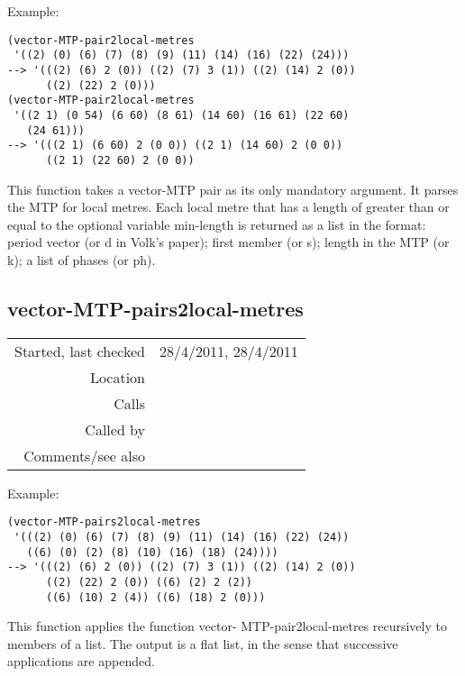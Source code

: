 \vspace{0.5cm}
\noindent Example:
\begin{verbatim}
(vector-MTP-pair2local-metres
 '((2) (0) (6) (7) (8) (9) (11) (14) (16) (22) (24)))
--> '(((2) (6) 2 (0)) ((2) (7) 3 (1)) ((2) (14) 2 (0))
      ((2) (22) 2 (0)))
(vector-MTP-pair2local-metres
 '((2 1) (0 54) (6 60) (8 61) (14 60) (16 61) (22 60)
   (24 61)))
--> '(((2 1) (6 60) 2 (0 0)) ((2 1) (14 60) 2 (0 0))
      ((2 1) (22 60) 2 (0 0))
\end{verbatim}

\noindent This function takes a vector-MTP pair as its
only mandatory argument. It parses the MTP for local
metres. Each local metre that has a length of greater
than or equal to the optional variable min-length is
returned as a list in the format: period vector (or d
in Volk's \citeyear{volk2008} paper); first member (or s);
length in the MTP (or k); a list of phases (or ph).


\subsection*{vector-MTP-pairs2local-metres}\label{fun:vector-MTP-pairs2local-metres}

\vspace{0.3cm}
\begin{tabular}{r|p{8cm}}
Started, last checked & 28/4/2011, 28/4/2011 \\
Location & \nameref{sec:inner-metric-analysis} \\
Calls & \nameref{fun:vector-MTP-pair2local-metres} \\
Called by & \nameref{fun:local-metres-via-SIA} \\
Comments/see also & 
\end{tabular}

\vspace{0.5cm}
\noindent Example:
\begin{verbatim}
(vector-MTP-pairs2local-metres
 '(((2) (0) (6) (7) (8) (9) (11) (14) (16) (22) (24))
   ((6) (0) (2) (8) (10) (16) (18) (24))))
--> '(((2) (6) 2 (0)) ((2) (7) 3 (1)) ((2) (14) 2 (0))
      ((2) (22) 2 (0)) ((6) (2) 2 (2))
      ((6) (10) 2 (4)) ((6) (18) 2 (0)))
\end{verbatim}

\noindent This function applies the function vector-
MTP-pair2local-metres recursively to members of a
list. The output is a flat list, in the sense that
successive applications are appended.




















